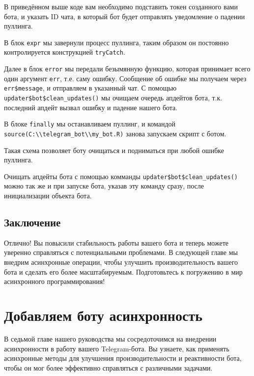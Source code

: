 \documentclass[
]{book}
\begin{document}
В приведённом выше коде вам необходимо подставить токен созданного вами бота, и указать ID чата, в который бот будет отправлять уведомление о падении пуллинга.

В блок \texttt{expr} мы завернули процесс пуллинга, таким образом он постоянно контролируется конструкцией \texttt{tryCatch}.

Далее в блок \texttt{error} мы передали безымянную функцию, которая принимает всего один аргумент \texttt{err}, т.е. саму ошибку. Сообщение об ошибке мы получаем через \texttt{err\$message}, и отправляем в указанный чат. С помощью \texttt{updater\$bot\$clean\_updates()} мы очищаем очередь апдейтов бота, т.к. последний апдейт вызвал ошибку и падение нашего бота.

В блоке \texttt{finally} мы останавливаем пуллинг, и командой \texttt{source(\textquotesingle{}C:\textbackslash{}\textbackslash{}telegram\_bot\textbackslash{}\textbackslash{}my\_bot.R\textquotesingle{})} занова запускаем скрипт с ботом.

Такая схема позволяет боту очищаться и подниматься при любой ошибке пуллинга.

Очищать апдейты бота с помощью комманды \texttt{updater\$bot\$clean\_updates()} можно так же и при запуске бота, указав эту команду сразу, после инициализации объекта бота.

\section{Заключение}\label{ux437ux430ux43aux43bux44eux447ux435ux43dux438ux435-5}

Отлично! Вы повысили стабильность работы вашего бота и теперь можете уверенно справляться с потенциальными проблемами. В следующей главе мы внедрим асинхронные операции, чтобы улучшить производительность вашего бота и сделать его более масштабируемым. Подготовьтесь к погружению в мир асинхронного программирования!

\chapter{Добавляем боту асинхронность}\label{ux434ux43eux431ux430ux432ux43bux44fux435ux43c-ux431ux43eux442ux443-ux430ux441ux438ux43dux445ux440ux43eux43dux43dux43eux441ux442ux44c}

В седьмой главе нашего руководства мы сосредоточимся на внедрении асинхронности в работу вашего Telegram-бота. Вы узнаете, как применять асинхронные методы для улучшения производительности и реактивности бота, чтобы он мог более эффективно справляться с различными задачами.
\end{document}
